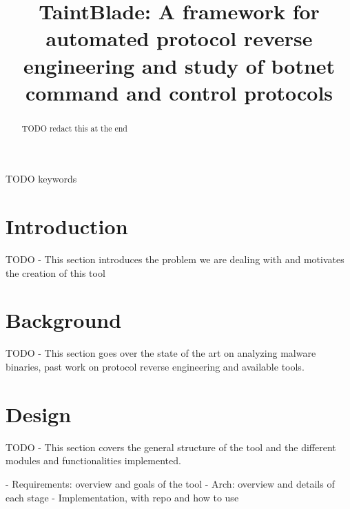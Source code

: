 \documentclass[conference]{IEEEtran}
\begin{document}
\title{TaintBlade: A framework for automated protocol reverse engineering and study of botnet command and control protocols
}

\author{
\and
{}
}

\maketitle

\begin{abstract}
TODO redact this at the end
\end{abstract}

\begin{IEEEkeywords}
TODO keywords
\end{IEEEkeywords}

\section{Introduction}
TODO - This section introduces the problem we are dealing with and motivates the creation of this tool

\section{Background}

TODO - This section goes over the state of the art on analyzing malware binaries, past work on protocol reverse 
engineering and available tools. 

\section{Design}
TODO - This section covers the general structure of the tool and the different modules and functionalities implemented.

- Requirements: overview and goals of the tool
- Arch: overview and details of each stage
- Implementation, with repo and how to use
\end{document}
